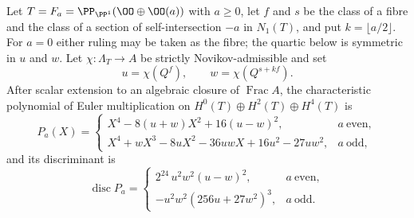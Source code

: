 \begin{lemma}
\label{lem:hirzebruch-euler-spectrum}
%
%
%
%
Let \(T=F_a=\PP_{\PP^1}(\OO\oplus\OO(a))\) with \(a\ge0\), let \(f\) and \(s\) be
the class of a fibre and the class of a section of self-intersection \(-a\) in
\(N_1(T)\), and put \(k=\lfloor a/2\rfloor\).  For \(a=0\) either ruling may be
taken as the fibre; the quartic below is symmetric in \(u\) and \(w\).  Let
\(\chi:\Lambda_T\to A\) be strictly
Novikov-admissible and set
\[
 u=\chi(Q^f),\qquad w=\chi(Q^{s+kf}).
\]
After scalar extension to an algebraic closure of \(\operatorname{Frac}A\), the
characteristic polynomial of Euler multiplication on
\(H^0(T)\oplus H^2(T)\oplus H^4(T)\) is
\[
 P_a(X)=
 \begin{cases}
  X^4-8(u+w)X^2+16(u-w)^2, & a\ \text{even},\\[2pt]
  X^4+wX^3-8uX^2-36uwX+16u^2-27uw^2, & a\ \text{odd},
 \end{cases}
 \label{eq:ruled-euler-quartic}
\]
and its discriminant is
\[
 \operatorname{disc}P_a=
 \begin{cases}
  2^{24}\,u^2w^2(u-w)^2, & a\ \text{even},\\[2pt]
  -u^2w^2\left(256u+27w^2\right)^3, & a\ \text{odd}.
 \end{cases}
 \label{eq:ruled-euler-discriminant}
\]
\end{lemma}

